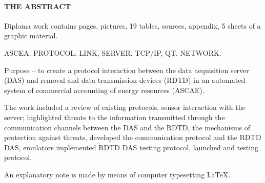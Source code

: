 \newpage
{}
\paragraph*{\hfill THE ABSTRACT \hfill}

Diploma work contains  pages,  pictures, 19 tables,  sources,  appendix, 5 sheets of a graphic material.

ASCEA, PROTOCOL, LINK, SERVER, TCP/IP, QT, NETWORK.

Purpose -- to create a protocol interaction between the data acquisition server (DAS) and removal and data transmission devices (RDTD) in an automated system of commercial accounting of energy resources (ASCAE).

The work included a review of existing protocols, sensor interaction with the server; highlighted threats to the information transmitted through the communication channels between the DAS and the RDTD, the mechanisms of protection against threats, developed the communication protocol and the RDTD DAS, emulators implemented RDTD DAS testing protocol, launched and testing protocol. 

An explanatory note is made by means of computer typesetting \LaTeX.